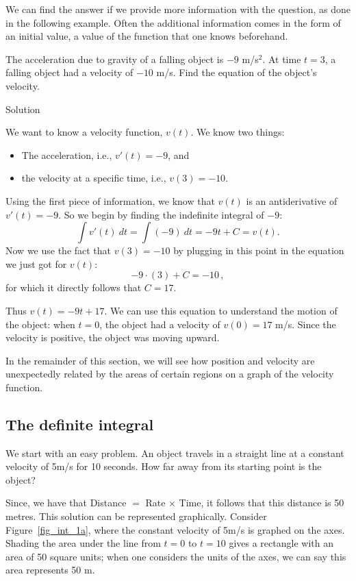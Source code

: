 We can find the answer if we provide more information with the question, as done in the following example. Often the additional information comes in the form of an initial value, a value of the function that one knows beforehand.

\begin{example}\label{ex_anti4}
The acceleration due to gravity of a falling object is $-9$ m/s$^2$. At time $t=3$, a falling object had a velocity of $-10$ m/s. Find the equation of the object's velocity.

Solution 

We want to know a velocity function, $v(t)$. We know two things:
	\begin{itemize}
		\item		The acceleration, i.e., $v'(t)= -9$, and
		\item		the velocity at a specific time, i.e., $v(3) = -10$.
	\end{itemize}
Using the first piece of information, we know that $v(t)$ is an antiderivative of $v'(t)=-9$. So we begin by finding the indefinite integral of $-9$:
		$$\int v'(t)\ dt=\int (-9)\ dt = -9t+C=v(t).$$
Now we use the fact that $v(3)=-10$ by plugging in this point in the equation we just got for $v(t)$: 
$$-9\cdot(3)+C = -10\,,$$
for which it directly follows that  $C = 17$. 

Thus $v(t)= -9t+17$. We can use this equation to understand the motion of the object: when $t=0$, the object had a velocity of $v(0) = 17$ m/s. Since the velocity is positive, the object was moving upward.
\end{example}

In the remainder of this section, we will see how position and velocity are unexpectedly related by the areas of certain regions on a graph of the velocity function.



\subsection{The definite integral}\label{sec:def_int}
We start with an easy problem. An object travels in a straight line at a constant velocity of 5m/s for 10 seconds. How far away from its starting point is the object?

Since, we have that Distance $=$ Rate $\times$ Time, it follows that this distance is 50 metres. This solution can be represented graphically. Consider Figure~\ref{fig_int_1a}, where the constant velocity of 5m/s is graphed on the axes. Shading the area under the line from $t=0$ to $t=10$ gives a rectangle with an area of 50 square units; when one considers the units of the axes, we can say this area represents 50 m.



